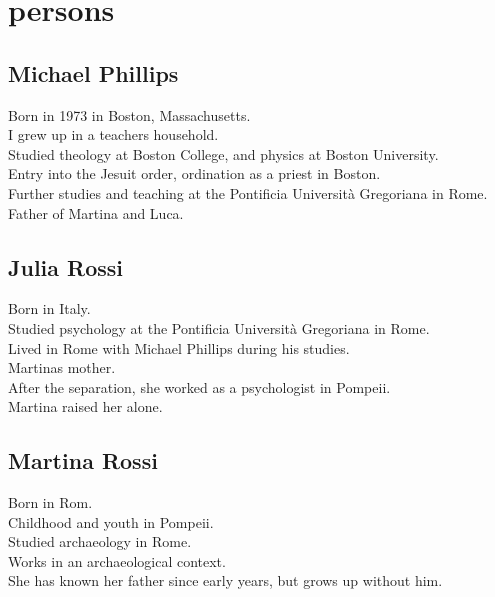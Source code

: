 \documentclass[
]{article}
\begin{document}
\section{persons}\label{persons}

\subsection{Michael Phillips}\label{michael-phillips}

Born in 1973 in Boston, Massachusetts.\\
I grew up in a teacher\textquotesingle s household.\\
Studied theology at Boston College, and physics at Boston University.\\
Entry into the Jesuit order, ordination as a priest in Boston.\\
Further studies and teaching at the Pontificia Università Gregoriana in Rome.\\
Father of Martina and Luca.

\subsection{Julia Rossi}\label{julia-rossi}

Born in Italy.\\
Studied psychology at the Pontificia Università Gregoriana in Rome.\\
Lived in Rome with Michael Phillips during his studies.\\
Martina\textquotesingle s mother.\\
After the separation, she worked as a psychologist in Pompeii.\\
Martina raised her alone.

\subsection{Martina Rossi}\label{martina-rossi}

Born in Rom.\\
Childhood and youth in Pompeii.\\
Studied archaeology in Rome.\\
Works in an archaeological context.\\
She has known her father since early years, but grows up without him.

\subsubsection{\texorpdfstring{\hfill\break
}{ }}\label{section}
\end{document}
